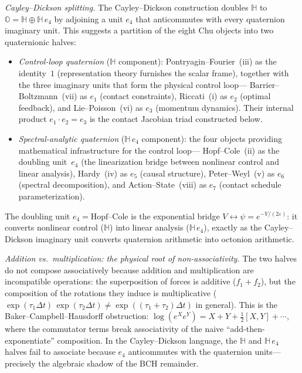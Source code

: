 \begin{remark}
\medskip\noindent\emph{Cayley--Dickson splitting.}
The Cayley--Dickson construction doubles
$\mathbb{H}$ to $\mathbb{O} = \mathbb{H} \oplus \mathbb{H}\,e_4$
by adjoining a unit $e_4$ that anticommutes with every quaternion
imaginary unit.
This suggests a partition of the eight Chu objects into two
quaternionic halves:
\begin{itemize}[nosep]
\item \emph{Control-loop quaternion} ($\mathbb{H}$ component):
  Pontryagin--Fourier~(iii) as the identity~$1$ (representation
  theory furnishes the scalar frame), together with the three
  imaginary units that form the physical control loop---%
  Barrier--Boltzmann~(vii) as $e_1$ (contact constraints),
  Riccati~(i) as $e_2$ (optimal feedback),
  and Lie--Poisson~(vi) as $e_3$ (momentum dynamics).
  Their internal product $e_1 \cdot e_2 = e_3$ is the contact
  Jacobian triad constructed below.
\item \emph{Spectral-analytic quaternion}
  ($\mathbb{H}\,e_4$ component):
  the four objects providing mathematical infrastructure for the
  control loop---%
  Hopf--Cole~(ii) as the doubling unit~$e_4$
  (the linearization bridge between nonlinear control and
  linear analysis),
  Hardy~(iv) as $e_5$ (causal structure),
  Peter--Weyl~(v) as $e_6$ (spectral decomposition),
  and Action--State~(viii) as $e_7$
  (contact schedule parameterization).
\end{itemize}
The doubling unit $e_4 = \text{Hopf--Cole}$ is the exponential
bridge $V \leftrightarrow \psi = e^{-V/(2\varepsilon)}$:
it converts nonlinear control ($\mathbb{H}$) into linear
analysis ($\mathbb{H}\,e_4$), exactly as the Cayley--Dickson
imaginary unit converts quaternion arithmetic into octonion
arithmetic.

\medskip\noindent\emph{Addition vs.\ multiplication: the physical
root of non-associativity.}
The two halves do not compose associatively because addition and
multiplication are incompatible operations: the superposition of
forces is additive ($f_1 + f_2$), but the composition of the
rotations they induce is multiplicative
($\exp(\tau_1 \Delta t)\,\exp(\tau_2 \Delta t)
\neq \exp((\tau_1 + \tau_2)\Delta t)$ in general).
This is the Baker--Campbell--Hausdorff obstruction:
$\log(e^X e^Y) = X + Y + \tfrac{1}{2}[X,Y] + \cdots$, where the
commutator terms break associativity of the naive
``add-then-exponentiate'' composition.
In the Cayley--Dickson language, the $\mathbb{H}$ and
$\mathbb{H}\,e_4$ halves fail to associate because
$e_4$ anticommutes with the quaternion units---precisely the
algebraic shadow of the BCH remainder.


\end{remark}

